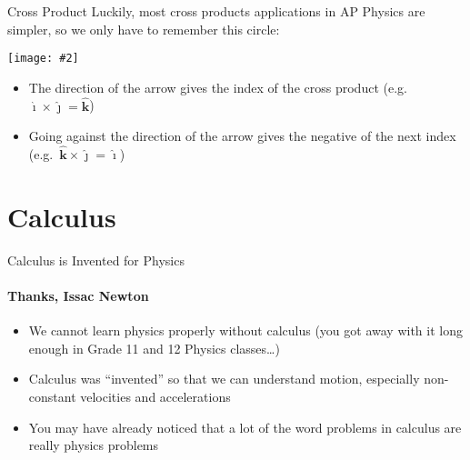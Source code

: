\documentclass[12pt,compress,aspectratio=169]{beamer}
\newcommand{\pic}[2]{\texttt{[image: \#2]}}
\begin{document}
\begin{frame}{Cross Product}
  Luckily, most cross products applications in AP Physics are simpler, so we
  only have to remember this circle:
  \begin{center}
    \vspace{-.2in}\pic{.12}{cross-product-circle.png}
  \end{center}
  \begin{itemize}
  \item The direction of the arrow gives the index of the cross product
    (e.g.\ $\bm{\hat{\imath}}\times\bm{\hat{\jmath}}=\bm{\hat{k}}$)
  \item Going against the direction of the arrow gives the negative of the next
    index (e.g.\ $\bm{\hat{k}}\times\bm{\hat{\jmath}}=\bm{\hat{\imath}}$)
  \end{itemize}
\end{frame}


\section{Calculus}

\begin{frame}{Calculus is Invented for Physics}
  \framesubtitle{Thanks, Issac Newton}
  \begin{itemize}
  \item We cannot learn physics properly without calculus (you got away with it
    long enough in Grade 11 and 12 Physics classes\ldots)
  \item Calculus was ``invented'' so that we can understand motion, especially
    non-constant velocities and accelerations
  \item You may have already noticed that a lot of the word problems in
    calculus are really physics problems
  \end{itemize}
\end{frame}
\end{document}
